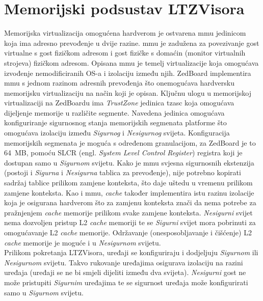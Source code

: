\documentclass[times, utf8, diplomski, numeric]{fer}
\begin{document}
\section{Memorijski podsustav LTZVisora}
Memorijska virtualizacija omogućena hardverom je ostvarena \gls{mmu} jedinicom koja ima adresno prevođenje u dvije razine. \gls{mmu} je
zadužena za povezivanje gost virtualne s gost fizičkom adresom i gost fizičke s domaćin (monitor virtualnih strojeva) fizičkom
adresom. Opisana \gls{mmu} je temelj virtualizacije koja omogućava izvođenje nemodificiranih OS-a i izolaciju između njih. ZedBoard
implementira \gls{mmu} s jednom razinom adresnih prevođenja što onemogućava hardversku memorijsku virtualizaciju na način koji je
opisan. Ključnu ulogu u memorijskoj virtualizaciji na ZedBoardu ima \textit{TrustZone} jedinica \gls{tzasc} koja omogućava dijeljenje
memorije u različite segmente. Navedena jedinica omogućava konfiguriranje sigurnosnog stanja memorijskih segmenata platforme
što omogućava izolaciju između \textit{Sigurnog} i \textit{Nesigurnog} svijeta. Konfiguracija memorijskih segmenata je moguća s određenom
granulacijom, za ZedBoard je to 64~MB, pomoću SLCR (engl. \textit{System Level Control Register}) registra koji je dostupan
samo u \textit{Sigurnom} svijetu. Kako je \gls{mmu} svjesna sigurnosnih ekstenzija (postoji i \textit{Sigurna} i \textit{Nesigurna} tablica za prevođenje),
nije potrebno kopirati sadržaj tablice prilikom zamjene konteksta, što daje uštedu u vremenu prilikom zamjene konteksta.
Kao i \gls{mmu}, \textit{cache} također implementira istu razinu izolacije koja je osigurana hardverom što za zamjenu konteksta
znači da nema potrebe za pražnjenjem \textit{cache} memorije prilikom svake zamjene konteksta. \textit{Nesigurni} svijet nema dozvoljen
pristup L2 \textit{cache} memoriji te se \textit{Sigurni} svijet mora pobrinuti za omogućavanje L2 \textit{cache} memorije. Održavanje
(onesposobljavanje i čišćenje) L2 \textit{cache} memorije je moguće i u \textit{Nesigurnom} svijetu. \\
Prilikom pokretanja LTZVisora, uređaji se konfiguriraju i dodjeljuju \textit{Sigurnom} ili \textit{Nesigurnom} svijetu. Takvo rukovanje uređajima
osigurava izolaciju na razini uređaja (uređaji se ne bi smjeli dijeliti između dva svijeta). \textit{Nesigurni} gost ne može pristupiti
\textit{Sigurnim} uređajima te se sigurnost uređaja može konfigurirati samo u \textit{Sigurnom} svijetu.
\end{document}
